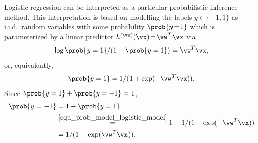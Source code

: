 \documentclass[12pt]{report}
\begin{document}
Logistic regression can be interpreted as a particular probabilistic inference method. This interpretation is 
based on modelling the labels $y \in \{-1,1\}$ as i.i.d.\ random variables with some probability $\prob{y\!=\!1}$ 
which is parameterized by a linear predictor $h^{(\vw)}(\vx)\!=\!\vw^{T} \vx$ via  
\begin{equation}
\log \prob {y=1}/(1 - \prob{y=1}) = \vw^{T} \vx, 
\end{equation} 
or, equivalently, 
\begin{equation}
\label{equ_prob_model_logistic_model}
 \prob{y=1}= 1/(1 + \exp(- \vw^{T} \vx) ). 
\end{equation} 
Since $\prob{y=1} + \prob{y=-1}=1$, 
\begin{align}
\label{equ_prob_model_logistic_model_minus_1}
\prob{y=-1} & =  1 - \prob{y=1} \nonumber \\
& \stackrel{\eqref{equ_prob_model_logistic_model}}{=} 1 - 1/(1+ \exp(-\vw^{T} \vx)) \nonumber \\
& = 1/(1+ \exp(\vw^{T} \vx)).
\end{align}
 
\end{document}
